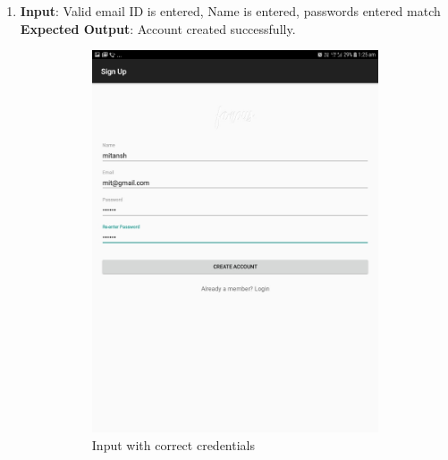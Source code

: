 \documentclass{scrreprt}
\begin{document}
\begin{itemize}
\begin{enumerate}
\item \textbf{Input}: Valid email ID is entered, Name is entered, passwords entered match\\
\textbf{Expected Output}: Account created successfully.
\begin{figure}[H]
\begin{subfigure}{0.5\textwidth}
\includegraphics[width=0.85\linewidth, keepaspectratio]{signupuser.jpg} 
\caption{Input with correct credentials}
\label{fig:subim1}
\end{subfigure}
\begin{subfigure}{0.5\textwidth}

\end{subfigure}
\end{figure}
\end{enumerate}
\end{itemize}
\end{document}

